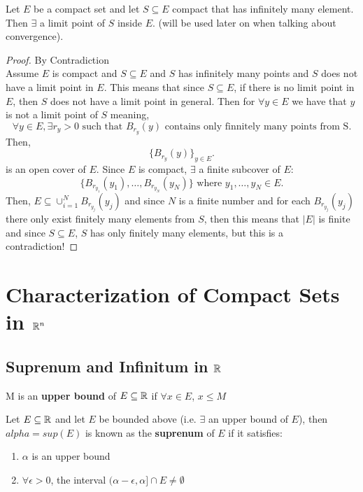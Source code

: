 \documentclass[a4paper]{article}
\begin{document}
\begin{prop}
  Let $E$ be a compact set and let  $S \subseteq E$ compact that has infinitely many element. Then  $\exists $
  a limit point of $S$ inside $E$. (will be used later on when talking about convergence).
  \begin{proof}{By Contradiction}\\
    Assume $E$ is compact and  $S \subseteq E$ and  $S$ has infinitely many points and $S$ does not have a 
    limit point in  $E$. This means that since $S \subseteq E$, if there is no limit point in $E$,
    then $S$ does not have a limit point in general. Then for $\forall y \in E$ we have that  $y$ is not
    a limit point of  $S$ meaning, 
     \[
        \forall y \in E, \exists r_y > 0 \text{ such that } B_{r_y} (y) \text{ contains only finnitely many points from S}
    .\] 
    Then, 
    \[
    \{B_{r_y} \left( y \right) \}_{y \in E}
    .\] 
    is an open cover of $E$. Since $E$ is compact, $\exists $ a finite subcover of $E$:
     \[
       \{ B_{r_{y_1}} (y_1), \ldots, B_{r_{y_N}}(y_N) \} \text{ where } y_1,\ldots,y_N \in E 
     .\] 
     Then, $E \subseteq \cup_{i=1}^N B_{r_{y_j}}(y_j)$ and since $N$ is a finite number and for each  $B_{r_{y_j}}(y_j)$ 
     there only exist finitely many elements from $S$, then this means that $|E|$ is finite and since $S \subseteq E$,
      $S$ has only finitely many elements, but this is a contradiction!
  \end{proof}
\end{prop}

\section{Characterization of Compact Sets in $\mathbb{R}^n$}

\subsection{Suprenum and Infinitum in $\mathbb{R}$}
\begin{definition}
  M is an \textbf{upper bound} of $E \subseteq \mathbb{R}$ if $\forall x \in E$,  $x \leq M$
\end{definition}

\begin{definition}
  Let  $E \subseteq \mathbb{R}$ and let $E$ be bounded above (i.e.  $\exists $ an upper bound of $E$), then
  $alpha = sup(E)$ is known as the \textbf{suprenum} of $E$ if it satisfies:
    \begin{enumerate}
     \item $\alpha$ is an upper bound
     \item  $\forall \epsilon > 0$, the interval $(\alpha - \epsilon, \alpha] \cap E \neq \emptyset$
   \end{enumerate}
\end{definition}
\end{document}
